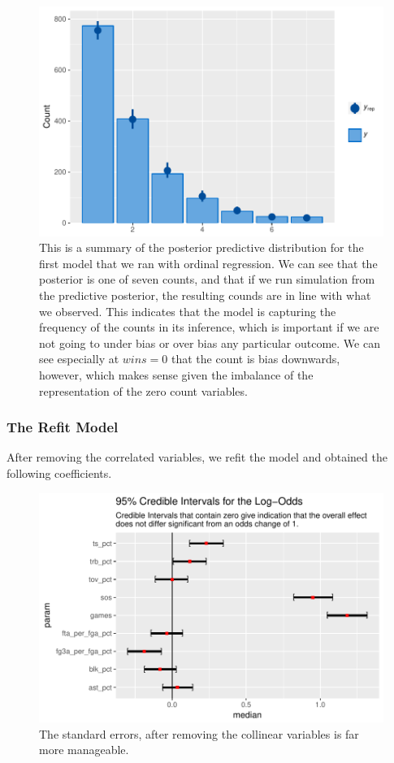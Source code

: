 \documentclass[10pt,a4paper, hidelinks]{article} %
\begin{document}
\begin{figure}[H]
	\centering
	\includegraphics[width=0.7\linewidth]{../fig/polr_nonames_pp}
	\caption{This is a summary of the posterior predictive distribution for the first model that we ran with ordinal regression. We can see that the posterior is one of seven counts, and that if we run simulation from the predictive posterior, the resulting counds are in line with what we observed. This indicates that the model is capturing the frequency of the counts in its inference, which is important if we are not going to under bias or over bias any particular outcome. We can see especially at $wins = 0$ that the count is bias downwards, however, which makes sense given the imbalance of the representation of the zero count variables.}
	\label{fig:polrnonamespp}
\end{figure}


\subsubsection{The Refit Model}

After removing the correlated variables, we refit the model and obtained the following coefficients.

\begin{figure}[H]
	\centering
	
\end{figure}

\begin{figure}[H]
	\centering
	\includegraphics[width=1\linewidth]{../fig/polr_coef}
	\caption{The standard errors, after removing the collinear variables is far more manageable.}
	\label{fig:polr_coef}
\end{figure}
\end{document}
